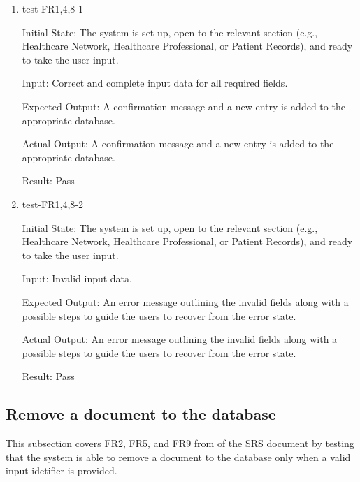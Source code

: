 \documentclass[12pt, titlepage]{article}
\begin{document}
\begin{enumerate}

  \item{test-FR1,4,8-1} \label{test-FR1,4,8-1}
  
  Initial State: The system is set up, open to the relevant section (e.g., Healthcare Network, Healthcare Professional, or Patient Records), and ready to take the user input.

  Input: Correct and complete input data for all required fields.

  Expected Output: A confirmation message and a new entry is added to the appropriate database.

  Actual Output: A confirmation message and a new entry is added to the appropriate database.

  Result: Pass


  \item{test-FR1,4,8-2} \label{test-FR1,4,8-2}

  Initial State: The system is set up, open to the relevant section (e.g., Healthcare Network, Healthcare Professional, or Patient Records), and ready to take the user input.

  Input: Invalid input data.

  Expected Output: An error message outlining the invalid fields along with a possible steps to guide the users to recover from the error state.

  Actual Output: An error message outlining the invalid fields along with a possible steps to guide the users to recover from the error state.

  Result: Pass

\end{enumerate}

\subsection{Remove a document to the database} \label{section:3.2}

This subsection covers FR2, FR5, and FR9 from of the \href{https://github.com/Inreet-Kaur/capstone/blob/main/docs/SRS/SRS.pdf}{SRS document} by testing that the system is able to remove a document to the database only when a valid input idetifier is provided.
\end{document}
